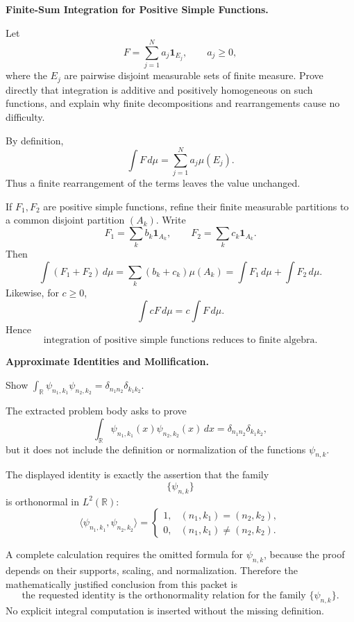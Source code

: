 \begin{problem}[CP-II-0046]
\label{prob:cp-ii-0046}
\textbf{Finite-Sum Integration for Positive Simple Functions.}

\hspace*{1.5em}Let
\[
F=\sum_{j=1}^N a_j\mathbf1_{E_j},
\qquad a_j\ge0,
\]
where the \(E_j\) are pairwise disjoint measurable sets of finite measure.
Prove directly that integration is additive and positively homogeneous on such
functions, and explain why finite decompositions and rearrangements cause no
difficulty.
\end{problem}

\begin{solution}
By definition,
\[
\int F\,d\mu=\sum_{j=1}^N a_j\mu(E_j).
\]
Thus a finite rearrangement of the terms leaves the value unchanged.

If \(F_1,F_2\) are positive simple functions, refine their finite measurable
partitions to a common disjoint partition \((A_k)\). Write
\[
F_1=\sum_k b_k\mathbf1_{A_k},
\qquad
F_2=\sum_k c_k\mathbf1_{A_k}.
\]
Then
\[
\int(F_1+F_2)\,d\mu
=
\sum_k(b_k+c_k)\mu(A_k)
=
\int F_1\,d\mu+\int F_2\,d\mu.
\]
Likewise, for \(c\ge0\),
\[
\int cF\,d\mu=c\int F\,d\mu.
\]
Hence
\[
\boxed{\text{integration of positive simple functions reduces to finite algebra}.}
\]
\end{solution}


\begin{problem}[CP-II-0049]
\label{prob:cp-ii-0049}
\textbf{Approximate Identities and Mollification.}

 \hspace*{1.5em}Show $\displaystyle \int_{\mathbb{R}}\psi_{n_1,k_1}\psi_{n_2,k_2}=\delta_{n_1n_2}\delta_{k_1k_2}$.
\end{problem}

\begin{solution}
The extracted problem body asks to prove
\[
\int_{\mathbb R}
\psi_{n_1,k_1}(x)\psi_{n_2,k_2}(x)\,dx
=
\delta_{n_1n_2}\delta_{k_1k_2},
\]
but it does not include the definition or normalization of the functions
\(\psi_{n,k}\).

The displayed identity is exactly the assertion that the family
\[
\{\psi_{n,k}\}
\]
is orthonormal in \(L^2(\mathbb R)\):
\[
\langle\psi_{n_1,k_1},\psi_{n_2,k_2}\rangle
=
\begin{cases}
1,&(n_1,k_1)=(n_2,k_2),\\
0,&(n_1,k_1)\ne(n_2,k_2).
\end{cases}
\]

A complete calculation requires the omitted formula for \(\psi_{n,k}\), because the proof
depends on their supports, scaling, and normalization. Therefore the mathematically justified
conclusion from this packet is
\[
\boxed{
\text{the requested identity is the orthonormality relation for the family }\{\psi_{n,k}\}.
}
\]
No explicit integral computation is inserted without the missing definition.
\end{solution}


